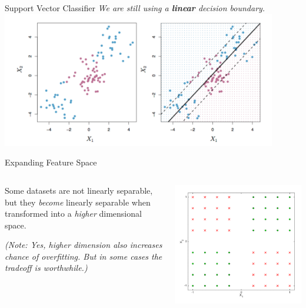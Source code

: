 \begin{frame}{Support Vector Classifier}
    \centering
    \textit{We are still using a \textbf{linear} decision boundary.}    
    \includegraphics[width=0.9\textwidth]{images/support-vector-machines/support-vector-machines-16.png}
\end{frame}


\begin{frame}{Expanding Feature Space}
    \begin{columns}
        \begin{column}{0.55\textwidth}
            \small
            Some datasets are not linearly separable, but they \textit{become} linearly separable when transformed into a \textit{higher} dimensional space.

            \vspace{0.5cm}
            \textit{(Note: Yes, higher dimension also increases chance of overfitting. But in some cases the tradeoff is worthwhile.)}
        \end{column}
        \begin{column}{0.45\textwidth}
            \includegraphics[width=\textwidth]{images/support-vector-machines/support-vector-machines-17.png}
        \end{column}
    \end{columns}
\end{frame}


